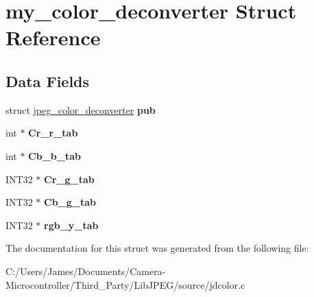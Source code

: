 \hypertarget{structmy__color__deconverter}{}\section{my\+\_\+color\+\_\+deconverter Struct Reference}
\label{structmy__color__deconverter}
\subsection*{Data Fields}
\begin{DoxyCompactItemize}
\item 
\mbox{\label{structmy__color__deconverter_aa068180d62b351ffd3413380eba4bd57}} 
struct \hyperlink{structjpeg__color__deconverter}{jpeg\+\_\+color\+\_\+deconverter} {\bfseries pub}
\item 
\mbox{\label{structmy__color__deconverter_ae6b1a209d6bbcec7d6014d03290137cd}} 
int $\ast$ {\bfseries Cr\+\_\+r\+\_\+tab}
\item 
\mbox{\label{structmy__color__deconverter_a9b8b7f4344f5a447b6c9a0921482f752}} 
int $\ast$ {\bfseries Cb\+\_\+b\+\_\+tab}
\item 
\mbox{\label{structmy__color__deconverter_ad54c533425d809157914a02b9ff91ce1}} 
I\+N\+T32 $\ast$ {\bfseries Cr\+\_\+g\+\_\+tab}
\item 
\mbox{\label{structmy__color__deconverter_a1233214ce2ede3cb9654441e97a50427}} 
I\+N\+T32 $\ast$ {\bfseries Cb\+\_\+g\+\_\+tab}
\item 
\mbox{\label{structmy__color__deconverter_a2054bd6a96072b861bff7d4578a89dbd}} 
I\+N\+T32 $\ast$ {\bfseries rgb\+\_\+y\+\_\+tab}
\end{DoxyCompactItemize}


The documentation for this struct was generated from the following file\+:\begin{DoxyCompactItemize}
\item 
C\+:/\+Users/\+James/\+Documents/\+Camera-\/\+Microcontroller/\+Third\+\_\+\+Party/\+Lib\+J\+P\+E\+G/source/jdcolor.\+c\end{DoxyCompactItemize}
